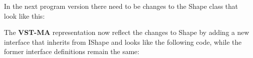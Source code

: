In the next program version there need to be changes to the {\ttfamily Shape} class that look like this\+: 
\begin{DoxyCode}{0}
\DoxyCodeLine{\{}
\DoxyCodeLine{\textcolor{keyword}{public}:}
\DoxyCodeLine{\textcolor{keyword}{protected}:}
\DoxyCodeLine{\};}
\end{DoxyCode}


The {\bfseries{V\+S\+T-\/\+MA}} representation now reflect the changes to Shape by adding a new interface that inherits from I\+Shape and looks like the following code, while the former interface definitions remain the same\+: 
\begin{DoxyCode}{0}
\DoxyCodeLine{\{}
\DoxyCodeLine{\textcolor{keyword}{public}:}
\DoxyCodeLine{\};}
\end{DoxyCode}
 